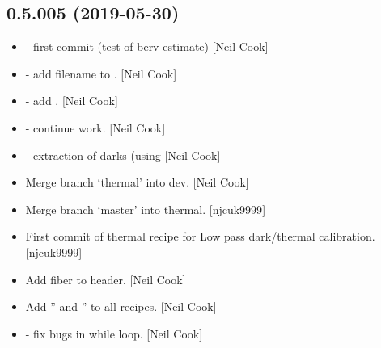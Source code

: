 \documentclass[a4paper,10pt,english]{report}
\begin{document}
\subsection{0.5.005 (2019-05-30)}
\label{\detokenize{misc/changelog:id131}}\begin{itemize}
\item {} 
 - first commit (test of berv estimate) {[}Neil Cook{]}

\item {} 
 - add filename to . {[}Neil Cook{]}

\item {} 
 - add . {[}Neil Cook{]}

\item {} 
 - continue work. {[}Neil Cook{]}

\item {} 
 - extraction of darks (using  {[}Neil
Cook{]}

\item {} 
Merge branch ‘thermal’ into dev. {[}Neil Cook{]}

\item {} 
Merge branch ‘master’ into thermal. {[}njcuk9999{]}

\item {} 
First commit of thermal recipe for Low pass dark/thermal calibration.
{[}njcuk9999{]}

\item {} 
Add fiber to header. {[}Neil Cook{]}

\item {} 
Add ” and ” to all recipes. {[}Neil Cook{]}

\item {} 
 - fix bugs in while loop. {[}Neil Cook{]}

\end{itemize}
\end{document}
